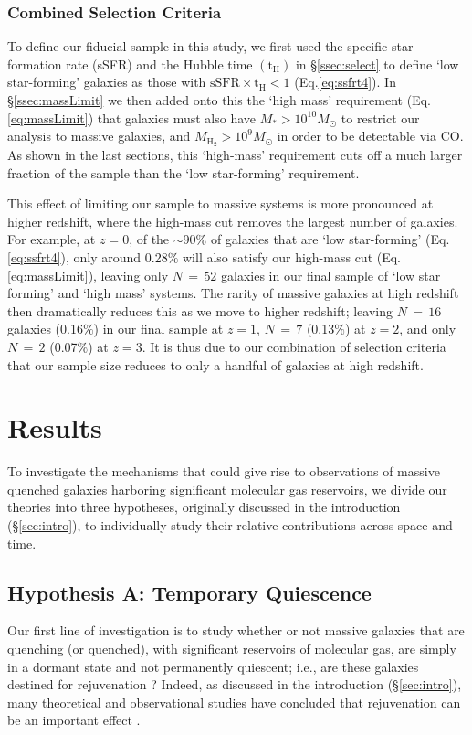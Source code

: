 \documentclass[twocolumn, linenumbers]{aastex631}
\newcommand{\mhh}{M_{\text{H}_2}}
\newcommand{\ssfr}{\text{sSFR}}
\newcommand{\tH}{\text{t}_\text{H}}
\newcommand{\eq}{Eq.\hspace{.2em}}
\begin{document}
\subsubsection{Combined Selection Criteria}
\label{ssec:selectCombined}
To define our fiducial sample in this study, we first used the specific star formation rate (sSFR) and the Hubble time $(\tH)$ in \S \ref{ssec:select} to define `low star-forming' galaxies as those with $\ssfr\times \tH < 1$ (\eq \ref{eq:ssfrt4}).  In \S \ref{ssec:massLimit} we then added onto this the `high mass' requirement (\eq \ref{eq:massLimit}) that galaxies must also have $M_*>10^{10}M_\odot$ to restrict our analysis to massive galaxies, and $\mhh>10^9M_\odot$ in order to be detectable via CO.  As shown in the last sections, this `high-mass' requirement cuts off a much larger fraction of the sample than the `low star-forming' requirement.  

This effect of limiting our sample to massive systems is more pronounced at higher redshift, where the high-mass cut removes the largest number of galaxies.  For example, at $z=0$, of the $\sim$90$\%$ of galaxies that are `low star-forming' (\eq \ref{eq:ssfrt4}), only around 0.28$\%$ will also satisfy our high-mass cut (\eq \ref{eq:massLimit}), leaving only $N\,\mathbin{=}\,52$ galaxies in our final sample of `low star forming' and `high mass' systems. The rarity of massive galaxies at high redshift then dramatically reduces this as we move to higher redshift; leaving $N\,\mathbin{=}\,16$ galaxies (0.16$\%$) in our final sample at $z=1$, $N\,\mathbin{=}\,7$ (0.13$\%$) at $z=2$, and only $N\,\mathbin{=}\,2$ (0.07$\%$) at $z=3$.  It is thus due to our combination of selection criteria that our sample size reduces to only a handful of galaxies at high redshift.
\section{Results}
\label{sec:results}
To investigate the mechanisms that could give rise to observations of massive quenched galaxies harboring significant molecular gas reservoirs, we divide our theories into three hypotheses, originally discussed in the introduction (\S \ref{sec:intro}), to individually study their relative contributions across space and time.

\subsection{Hypothesis A: Temporary Quiescence}
\label{ssec:HA}
Our first line of investigation is to study whether or not massive galaxies that are quenching (or quenched), with significant reservoirs of molecular gas, are simply in a dormant state and not permanently quiescent; i.e., are these galaxies destined for rejuvenation \citep{remus2023, Kimmig25}?  Indeed, as discussed in the introduction (\S\ref{sec:intro}), many theoretical and observational studies have concluded that rejuvenation can be an important effect \citep{Lotz21, remus2023, Kimmig25, harrold2025, colibre, cenci25, setton2025}.
\end{document}
